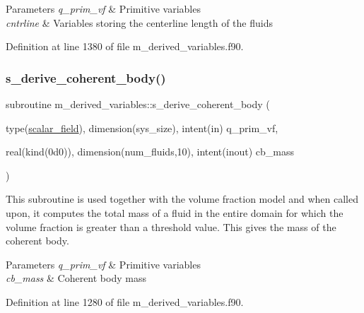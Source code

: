 \begin{DoxyParams}{Parameters}
{\em q\+\_\+prim\+\_\+vf} & Primitive variables \\
\hline
{\em cntrline} & Variables storing the centerline length of the fluids \\
\hline
\end{DoxyParams}


Definition at line 1380 of file m\+\_\+derived\+\_\+variables.\+f90.

\mbox{\label{namespacem__derived__variables_a2472e46739cdedf315aefa209a08f211}} 
\subsubsection{\texorpdfstring{s\+\_\+derive\+\_\+coherent\+\_\+body()}{s\_derive\_coherent\_body()}}
{\footnotesize\ttfamily subroutine m\+\_\+derived\+\_\+variables\+::s\+\_\+derive\+\_\+coherent\+\_\+body (\begin{DoxyParamCaption}\item[{type(\hyperlink{structm__derived__types_1_1scalar__field}{scalar\+\_\+field}), dimension(sys\+\_\+size), intent(in)}]{q\+\_\+prim\+\_\+vf,  }\item[{real(kind(0d0)), dimension(num\+\_\+fluids,10), intent(inout)}]{cb\+\_\+mass }\end{DoxyParamCaption})}



This subroutine is used together with the volume fraction model and when called upon, it computes the total mass of a fluid in the entire domain for which the volume fraction is greater than a threshold value. This gives the mass of the coherent body. 


\begin{DoxyParams}{Parameters}
{\em q\+\_\+prim\+\_\+vf} & Primitive variables \\
\hline
{\em cb\+\_\+mass} & Coherent body mass \\
\hline
\end{DoxyParams}


Definition at line 1280 of file m\+\_\+derived\+\_\+variables.\+f90.

